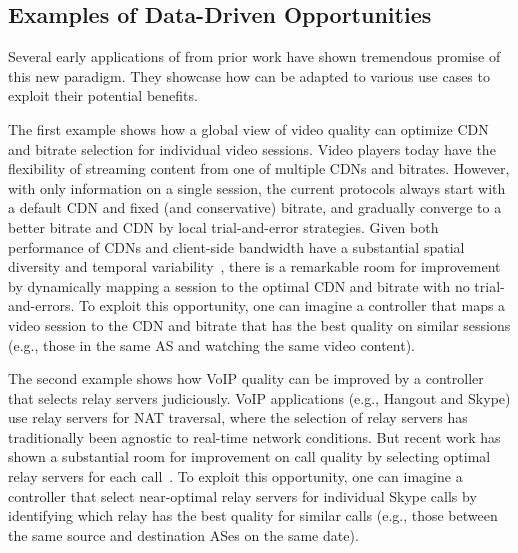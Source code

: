 \subsection{Examples of Data-Driven Opportunities}
\label{subsec:overview:examples}

Several early applications of \ddn from prior work have shown 
tremendous promise of this new paradigm.
They showcase how \ddn can be adapted to various use cases 
to exploit their potential benefits. %

The first example shows how a global view of video quality 
can optimize CDN and bitrate selection for individual video 
sessions. 
Video players today have the flexibility of streaming content 
from one of multiple CDNs and bitrates. However, with
only information on a single session, the current protocols 
always start with a default CDN and fixed (and conservative) 
bitrate, and gradually converge to a better bitrate and 
CDN by local trial-and-error strategies.
Given both performance of CDNs and client-side bandwidth 
have a substantial spatial diversity
  and temporal variability~\cite{sigcomm12}, there is a
remarkable room for improvement by dynamically mapping a 
session to the optimal CDN and bitrate with no trial-and-errors.
To exploit this opportunity, one can imagine a \ddn controller
that maps a video session  to the CDN and bitrate that has 
the best quality on similar sessions (e.g.,
those in the same AS and watching the same video content).


The second example shows how VoIP quality can be improved by 
a \ddn controller that selects relay servers judiciously.
VoIP applications (e.g., Hangout and Skype) use relay servers 
for NAT traversal, where the selection of relay servers 
has traditionally been agnostic to real-time network conditions. 
But recent work has shown a
substantial room for improvement on call quality by selecting 
optimal relay servers for each
call~\cite{rewan-hotnets2015}. 
To exploit this opportunity, one can imagine a \ddn controller
that select near-optimal relay servers for individual Skype calls 
by identifying which relay has the best quality for similar calls 
(e.g., those between the same source and destination ASes 
on the same date).


